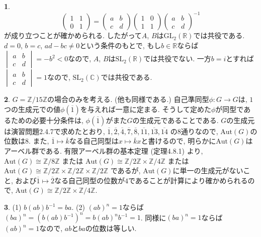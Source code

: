 \documentclass{amsart}
\theoremstyle{definition}
\newtheorem{ans}{}
\numberwithin{ans}{subsection}
\begin{document}
\begin{ans}
  \[
    \begin{pmatrix}
      1 & 1 \\
      0 & 1
    \end{pmatrix} = \begin{pmatrix}
      a & b \\
      c & d
    \end{pmatrix} \begin{pmatrix}
      1 & 0 \\
      1 & 1
    \end{pmatrix} \begin{pmatrix}
      a & b \\
      c & d
    \end{pmatrix}^{-1}
  \]
  が成り立つことが確かめられる.
  したがって$A$, $B$は$\mathrm{GL}_2(\mathbb{R})$では共役である.
  $d = 0$, $b = c$, $ad - bc \neq 0$という条件のもとで, もし$b \in \mathbb{R}$ならば$
  \begin{vmatrix}
    a & b \\
    c & d
  \end{vmatrix} = - b^2 < 0
  $なので, $A$, $B$は$\mathrm{SL}_2(\mathbb{R})$では共役でない.
  一方$b = i$とすれば$
  \begin{vmatrix}
    a & b \\
    c & d
  \end{vmatrix} = 1
  $なので, $\mathrm{SL}_2(\mathbb{C})$では共役である.
\end{ans}

\begin{ans}
  $G = \mathbb{Z}/15\mathbb{Z}$の場合のみを考える. (他も同様である.)
  自己準同型$\phi: G \rightarrow G$は,
  $1$つの生成元での値$\phi(\overline{1})$を与えれば一意に定まる.
  そうして定めた$\phi$が同型であるための必要十分条件は, $\phi(\overline{1})$がまた$G$の生成元であることである.
  $G$の生成元は演習問題2.4.7で求めたとおり,
  $\overline{1}, \overline{2}, \overline{4}, \overline{7}, \overline{8}, \overline{11}, \overline{13}, \overline{14}$
  の$8$通りなので, $\mathrm{Aut}(G)$の位数は$8$.
  また, $\overline{1} \mapsto \overline{k}$なる自己同型は$x \mapsto \overline{k}x$と書けるので,
  明らかに$\mathrm{Aut}(G)$はアーベル群である.
  有限アーベル群の基本定理 (定理4.8.1) より,
  $\mathrm{Aut}(G) \cong \mathbb{Z}/8\mathbb{Z}$
  または
  $\mathrm{Aut}(G) \cong \mathbb{Z}/2\mathbb{Z} \times \mathbb{Z}/4\mathbb{Z}$
  または
  $\mathrm{Aut}(G) \cong \mathbb{Z}/2\mathbb{Z} \times \mathbb{Z}/2\mathbb{Z} \times \mathbb{Z}/2\mathbb{Z}$
  であるが, $\mathrm{Aut}(G)$に単一の生成元がないこと,
  および$\overline{1} \mapsto \overline{2}$なる自己同型の位数が$4$であることが計算により確かめられるので,
  $\mathrm{Aut}(G) \cong \mathbb{Z}/2\mathbb{Z} \times \mathbb{Z}/4\mathbb{Z}$.
\end{ans}

\begin{ans}
  (1) $b(ab)b^{-1} = ba$.
  (2) $(ab)^n = 1$ならば$(ba)^n = (b(ab)b^{-1})^n = b(ab)^nb^{-1} = 1$.
  同様に$(ba)^n = 1$ならば$(ab)^n = 1$なので, $ab$と$ba$の位数は等しい.
\end{ans}
\end{document}
